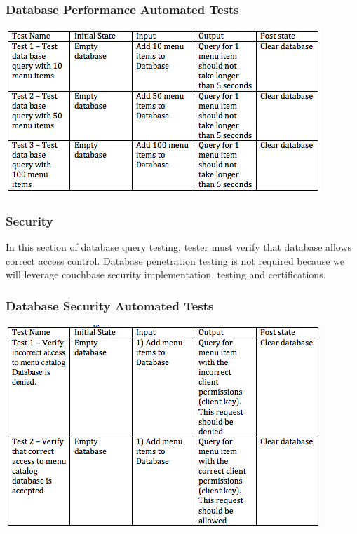 \documentclass[12pt]{article}
\begin{document}
\subsubsection{Database Performance Automated Tests }
\includegraphics[width=\textwidth,height=\textheight,keepaspectratio]{performance_tests.png}

\subsubsection{Security}
In this section of database query testing, tester must verify that database allows correct access control. Database penetration testing is not required because we will leverage couchbase security implementation, testing and certifications.
\subsubsection{Database Security Automated Tests }
\includegraphics[width=\textwidth,height=\textheight,keepaspectratio]{Security_tests.png}
\end{document}
